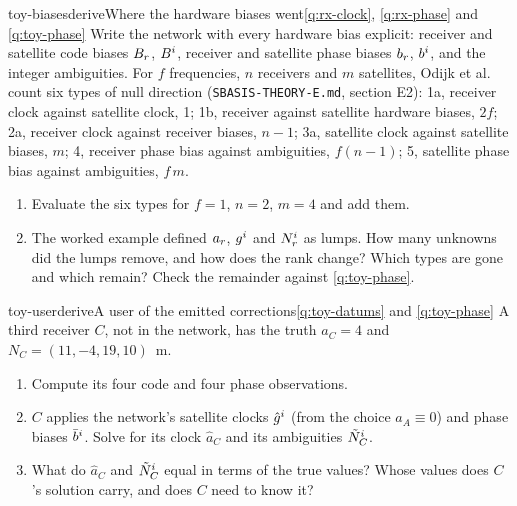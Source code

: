 \begin{question}{toy-biases}{derive}{Where the hardware biases went}{\ref{q:rx-clock}, \ref{q:rx-phase} and \ref{q:toy-phase}}
Write the network with every hardware bias explicit: receiver and satellite code
biases $B_r$, $B^i$, receiver and satellite phase biases $b_r$, $b^i$,
and the integer ambiguities. For $f$ frequencies, $n$ receivers and $m$
satellites, Odijk et al.~\cite{odijk2016estimability} count six types of null
direction (\texttt{SBASIS-THEORY-E.md}, section E2): 1a, receiver clock against
satellite clock, 1; 1b, receiver against satellite hardware biases, $2f$; 2a,
receiver clock against receiver biases, $n-1$; 3a, satellite clock against
satellite biases, $m$; 4, receiver phase bias against ambiguities, $f(n-1)$; 5,
satellite phase bias against ambiguities, $f\,m$.
\begin{enumerate}[leftmargin=*, itemsep=1pt]
\item Evaluate the six types for $f = 1$, $n = 2$, $m = 4$ and add them.
\item The worked example defined $a_r$, $g^i$ and $N^i_r$ as lumps.
      How many unknowns did the lumps remove, and how does the rank change?
      Which types are gone and which remain? Check the remainder against
      \cref{q:toy-phase}.
\end{enumerate}
\end{question}

\begin{question}{toy-user}{derive}{A user of the emitted corrections}{\ref{q:toy-datums} and \ref{q:toy-phase}}
A third receiver $C$, not in the network, has the truth $a_C = 4$ and
$N_C = (11, -4, 19, 10)$~m.
\begin{enumerate}[leftmargin=*, itemsep=1pt]
\item Compute its four code and four phase observations.
\item $C$ applies the network's satellite clocks $\hat g^i$ (from the choice
      $a_A \equiv 0$) and phase biases $\bar b^i$. Solve for its clock
      $\hat a_C$ and its ambiguities $\tilde N^i_C$.
\item What do $\hat a_C$ and $\tilde N^i_C$ equal in terms of the true values?
      Whose values does $C$'s solution carry, and does $C$ need to know it?
\end{enumerate}
\end{question}

